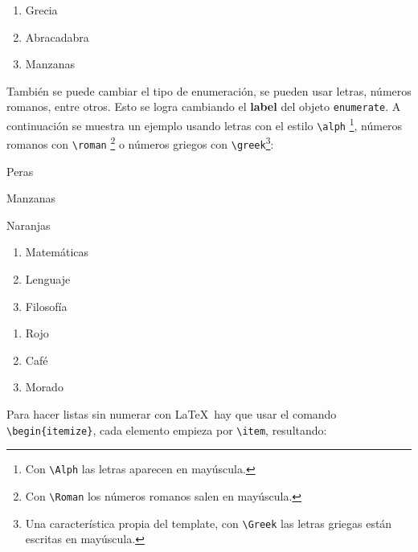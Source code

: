 		\begin{enumerate}
			\item Grecia
			\item Abracadabra
			\item Manzanas
		\end{enumerate}

		También se puede cambiar el tipo de enumeración, se pueden usar letras, números romanos, entre otros. Esto se logra cambiando el \textbf{label} del objeto \texttt{enumerate}. A continuación se muestra un ejemplo usando letras con el estilo \texttt{\textbackslash alph} \footnote{Con \texttt{\textbackslash Alph} las letras aparecen en mayúscula.}, números romanos con \texttt{\textbackslash roman} \footnote{Con \texttt{\textbackslash Roman} los números romanos salen en mayúscula.} o números griegos con \texttt{\textbackslash greek}\footnote{Una característica propia del template, con \texttt{\textbackslash Greek} las letras griegas están escritas en mayúscula.}:

		\begin{multicols}{3}
			\begin{enumeratebf}[label=\alph*) ] %
				\item Peras
				\item Manzanas
				\item Naranjas
			\end{enumeratebf}

			\begin{enumerate}[label=\greek*) ]
				\item Matemáticas
				\item Lenguaje
				\item Filosofía
			\end{enumerate}

			\begin{enumerate}[label=\roman*) ]
				\item Rojo
				\item Café
				\item Morado
			\end{enumerate}
		\end{multicols}

		Para hacer listas sin numerar con \LaTeX\ hay que usar el comando \texttt{\textbackslash begin\{itemize\}}, cada elemento empieza por \texttt{\textbackslash item}, resultando:

